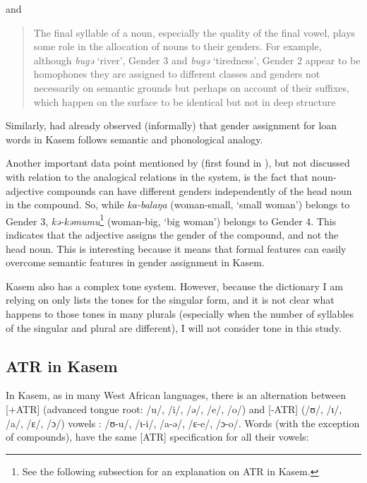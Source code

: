 and

\begin{quotation}
  The final syllable of a noun, especially the quality of the final vowel, plays some role in the allocation of nouns to their genders. For example, although \textit{bugə} `river', Gender 3 and \textit{bugə} `tiredness', Gender 2 appear to be homophones they are assigned to different classes and genders not necessarily on semantic grounds but perhaps on account of their suffixes, which happen on the surface to be identical but not in deep structure \autocite[13]{Awedoba.2003}
\end{quotation}

Similarly, \textcite[250]{Awedoba.1980} had already observed (informally) that gender assignment for loan words in Kasem follows semantic and phonological analogy.

Another important data point mentioned by \textcite[13]{Awedoba.2003} (first found in \cite{Awedoba.1996}), but not discussed with relation to the analogical relations in the system, is the fact that noun-adjective compounds can have different genders independently of the head noun in the compound. So, while \textit{ka-balaŋa} (woman-small, `small woman') belongs to Gender 3, \textit{kə-kəmumu}\footnote{See the following subsection for an explanation on ATR in Kasem.} (woman-big, `big wo\-man') belongs to Gender 4. This indicates that the adjective assigns the gender of the compound, and not the head noun. This is interesting because it means that formal features can easily overcome semantic features in gender assignment in Kasem.

Kasem also has a complex tone system. However, because the dictionary I am relying on \autocite{Niggli.2016} only lists the tones for the singular form, and it is not clear what happens to those tones in many plurals (especially when the number of syllables of the singular and plural are different), I will not consider tone in this study.

\subsection{ATR in Kasem}

In Kasem, as in many West African languages, there is an alternation between [+ATR] (advanced tongue root: /u/, /i/, /ə/, /e/, /o/) and [-ATR] (/ʊ/, /ɩ/, /a/, /ɛ/, /ɔ/) vowels \autocite{Casali.2008}: /ʊ-u/, /ɩ-i/, /a-ə/, /ɛ-e/, /ɔ-o/. Words (with the exception of compounds), have the same [ATR] specification for all their vowels:

